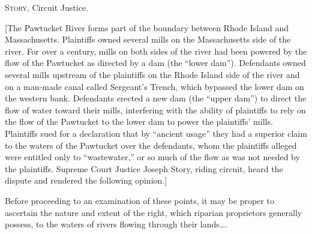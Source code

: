 

\opinion \textsc{Story}, Circuit Justice.

[The Pawtucket River forms part of the boundary between Rhode Island and
Massachusetts. Plaintiffs owned several mills on the Massachusetts side of the
river. For over a century, mills on both sides of the river had been powered by
the flow of the Pawtucket as directed by a dam (the ``lower dam''). Defendants
owned several mills upstream of the plaintiffs on the Rhode Island side of the
river and on a man-made canal called Sergeant's Trench, which bypassed the lower
dam on the western bank. Defendants erected a new dam (the ``upper dam'') to
direct the flow of water toward their mills, interfering with the ability of
plaintiffs to rely on the flow of the Pawtucket to the lower dam to power the
plaintiffs' mills. Plaintiffs sued for a declaration that by ``ancient usage''
they had a superior claim to the waters of the Pawtucket over the defendants,
whom the plaintiffs alleged were entitled only to ``wastewater,'' or so much of
the flow as was not needed by the plaintiffs. Supreme Court Justice Joseph
Story, riding circuit, heard the dispute and rendered the following opinion.]

Before proceeding to an examination of these points, it may be proper to
ascertain the nature and extent of the right, which riparian proprietors
generally possess, to the waters of rivers flowing through their lands\ldots .

